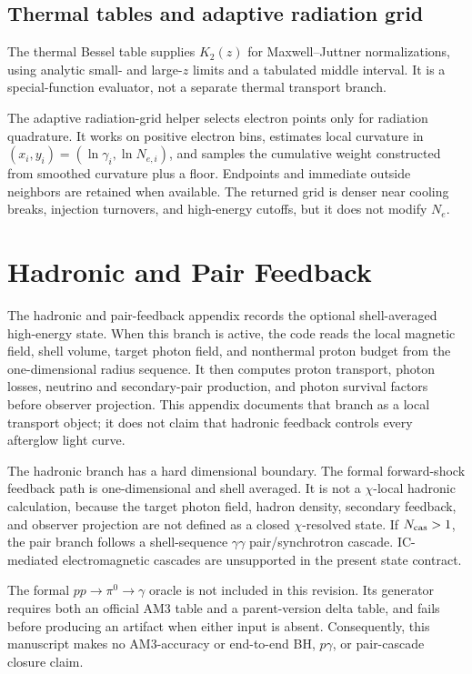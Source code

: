 \documentclass[twocolumn]{aastex702}
\begin{document}
\subsection{Thermal tables and adaptive radiation grid}

The thermal Bessel table supplies \(K_2(z)\) for Maxwell--Juttner normalizations,
using analytic small- and large-\(z\) limits and a tabulated middle interval.  It
is a special-function evaluator, not a separate thermal transport branch.

The adaptive radiation-grid helper selects electron points only for radiation
quadrature.  It works on positive electron bins, estimates local curvature in
\((x_i,y_i)=(\ln\gamma_i,\ln N_{e,i})\), and samples the cumulative weight
constructed from smoothed curvature plus a floor.  Endpoints and immediate
outside neighbors are retained when available.  The returned grid is denser near
cooling breaks, injection turnovers, and high-energy cutoffs, but it does not
modify \(N_e\).

\section{Hadronic and Pair Feedback} \label{app:hadronic-pair-feedback}\label{app:hadronic-figure}

The hadronic and pair-feedback appendix records the optional shell-averaged
high-energy state.  When this branch is active, the code reads the local magnetic
field, shell volume, target photon field, and nonthermal proton budget from the
one-dimensional radius sequence.  It then computes proton transport, photon
losses, neutrino and secondary-pair production, and photon survival factors
before observer projection.  This appendix documents that branch as a local
transport object; it does not claim that hadronic feedback controls every
afterglow light curve.

The hadronic branch has a hard dimensional boundary.  The formal forward-shock
feedback path is one-dimensional and shell averaged.  It is not a \(\chi\)-local
hadronic calculation, because the target photon field, hadron density, secondary
feedback, and observer projection are not defined as a closed \(\chi\)-resolved
state.  If \(N_{\rm cas}>1\), the pair branch follows a shell-sequence
\(\gamma\gamma\) pair/synchrotron cascade.  IC-mediated electromagnetic cascades
are unsupported in the present state contract.

The formal \(pp\to\pi^0\to\gamma\) oracle is not included in this revision.
Its generator requires both an official AM3 table and a parent-version delta
table, and fails before producing an artifact when either input is absent.
Consequently, this manuscript makes no AM3-accuracy or end-to-end BH,
\(p\gamma\), or pair-cascade closure claim.
\end{document}
